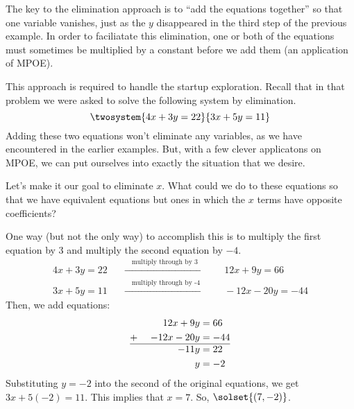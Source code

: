 The key to the elimination approach is to ``add the equations together'' so that one variable vanishes, just as the $y$ disappeared in the third step of the previous example. In order to faciliatate this elimination, one or both of the equations must sometimes be multiplied by a constant before we add them (an application of MPOE).

This approach is required to handle the startup exploration. Recall that in that problem we were asked to solve the following system by elimination.\[\twosystem{4x+3y=22}{3x+5y=11}\]
Adding these two equations won't eliminate any variables, as we have encountered in the earlier examples. But, with a few clever applicatons on MPOE, we can put ourselves into exactly the situation that we desire.

Let's make it our goal to eliminate $x$. What could we do to these equations so that we have equivalent equations but ones in which the $x$ terms have opposite coefficients?

One way (but not the only way) to accomplish this is to multiply the first equation by 3 and multiply the second equation by $-4$.
\[\begin{array}{lcl}
4x+3y=22
& \quad \xrightarrow{\quad\text{multiply through by 3}\quad}
& \quad 12x + 9y = 66
\\
3x+5y=11
& \quad \xrightarrow{\quad\text{multiply through by -4}\quad}
& \quad -12x - 20y = -44
\end{array}\]
Then, we add equations:
\[
\begin{aligned}
		&&12x + 9y		&= 66\\
+~		&&-12x - 20y	&= -44\\\hline
		&&-11y	& = 22\\
		&&y	& = -2\\
\end{aligned}
\]
Substituting $y=-2$ into the second of the original equations, we get $3x + 5(-2) = 11$. This implies that $x=7$. So, $\solset{(7,-2)}$.

